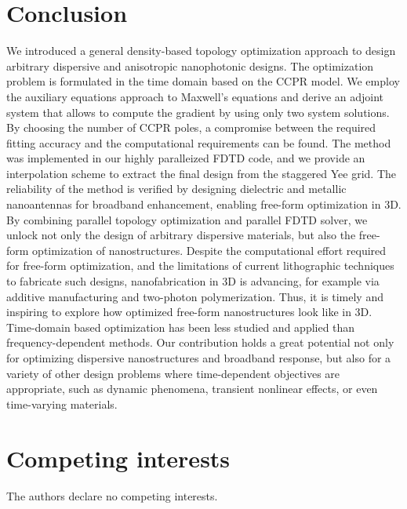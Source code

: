 \documentclass[aps,prl,twocolumn,superscriptaddress,longbibliography]{revtex4-1}
\begin{document}
\section{Conclusion}\label{Sec:Conclusions}
We introduced a general density-based topology optimization approach to design arbitrary dispersive and anisotropic nanophotonic designs.
The optimization problem is formulated in the time domain based on the CCPR model.
We employ the auxiliary equations approach to Maxwell's equations and derive an adjoint system that allows to compute the gradient by using only two system solutions.
By choosing the number of CCPR poles, a compromise between the required fitting accuracy and the computational requirements can be found. The method was implemented in our highly paralleized  FDTD code, and we provide an interpolation scheme to extract the final design from the staggered Yee grid. 
The reliability of the method is verified by designing dielectric and metallic nanoantennas for broadband enhancement, enabling free-form optimization in 3D.
%
By combining parallel topology optimization and parallel FDTD solver, we unlock not only the design of arbitrary dispersive materials, but also the free-form optimization of nanostructures.
Despite the computational effort required for free-form optimization, and the limitations of current lithographic techniques to fabricate such designs, nanofabrication in 3D is advancing, for example via additive manufacturing and two-photon polymerization.
Thus, it is timely and inspiring to explore how optimized free-form nanostructures look like in 3D.
%
Time-domain based optimization has been less studied and applied than frequency-dependent methods.
Our contribution holds a great potential not only for optimizing dispersive nanostructures and broadband response, but also for a variety of other design problems where time-dependent objectives are appropriate, such as dynamic phenomena, transient nonlinear effects, or even time-varying materials.


\section{Competing interests} 

The authors declare no competing interests.
\end{document}
